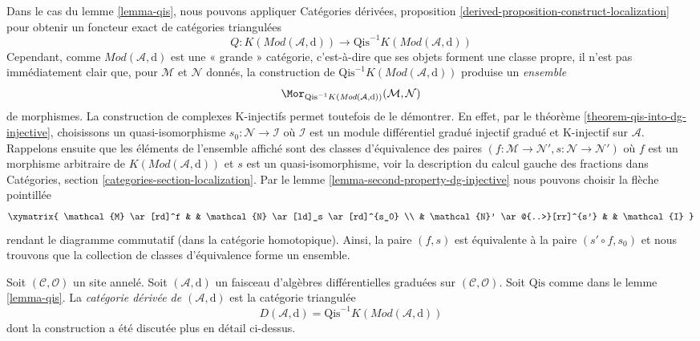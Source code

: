 \noindent
Dans le cas du lemme \ref{lemma-qis}, nous pouvons appliquer
Catégories dérivées, proposition
\ref{derived-proposition-construct-localization} pour
obtenir un foncteur exact de catégories triangulées
$$ Q
:
K(\textit{Mod}(\mathcal{A}, \text{d}))
\longrightarrow
\text{Qis}^{-1}K(\textit{Mod}(\mathcal{A}, \text{d}))
$$ Cependant,
comme $\textit{Mod}(\mathcal{A}, \text{d})$ est une « grande »
catégorie, c'est-à-dire que ses objets forment une classe propre, il n'est pas
immédiatement clair que, pour $\mathcal{M}$ et $\mathcal{N}$ donnés, la
construction de $\text{Qis}^{-1}K(\textit{Mod}(\mathcal{A}, \text{d}))$
produise un {\it ensemble}
$$
\Mor_{\text{Qis}^{-1}K(\textit{Mod}(\mathcal{A}, \text{d}))}
(\mathcal{M}, \mathcal{N})
$$
de morphismes. La construction de complexes K-injectifs permet
toutefois de le démontrer. En effet, par le théorème \ref{theorem-qis-into-dg-injective},
choisissons un quasi-isomorphisme $s_0 : \mathcal{N} \to \mathcal{I}$ où
$\mathcal{I}$ est un module différentiel gradué injectif
gradué et K-injectif sur $\mathcal{A}$. Rappelons ensuite que les éléments
de l'ensemble affiché sont des classes d'équivalence des
paires $(f : \mathcal{M} \to \mathcal{N}', s : \mathcal{N} \to \mathcal{N}')$
où $f$ est un morphisme arbitraire de
$K(\textit{Mod}(\mathcal{A}, \text{d}))$ et $s$ est un quasi-isomorphisme, voir la
description du calcul gauche des fractions dans Catégories,
section \ref{categories-section-localization}. Par le lemme
\ref{lemma-second-property-dg-injective} nous pouvons
choisir la flèche pointillée
$$
\xymatrix{
\mathcal{M} \ar[rd]^f & &
\mathcal{N} \ar[ld]_s \ar[rd]^{s_0} \\ &
\mathcal{N}' \ar@{..>}[rr]^{s'} & & \mathcal{I}
}
$$ rendant
le diagramme commutatif (dans la catégorie homotopique).
Ainsi, la paire $(f, s)$ est équivalente à la paire $(s' \circ f, s_0)$ et
nous trouvons que la collection de classes d'équivalence forme un ensemble.

\begin{definition}
\label{definition-derived-category} Soit
$(\mathcal{C}, \mathcal{O})$ un site annelé. Soit
$(\mathcal{A}, \text{d})$ un faisceau d'algèbres différentielles graduées sur
$(\mathcal{C}, \mathcal{O})$. Soit $\text{Qis}$ comme dans le lemme
\ref{lemma-qis}. La
{\it catégorie dérivée de $(\mathcal{A}, \text{d})$} est la catégorie
triangulée
$$
D(\mathcal{A}, \text{d}) =
\text{Qis}^{-1}K(\textit{Mod}(\mathcal{A}, \text{d}))
$$ dont la construction a été
discutée plus en détail ci-dessus.
\end{definition}

